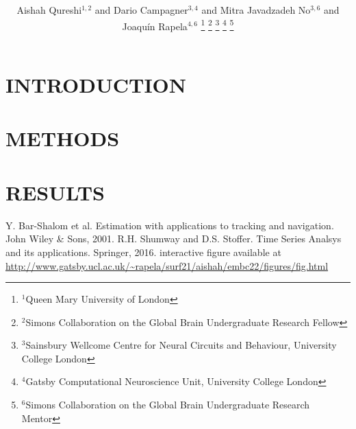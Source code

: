 \documentclass[letterpaper, 10 pt, conference]{ieeeconf}  %
\title{\LARGE \bf

}
\author{Aishah Qureshi$^{1,2}$ and Dario Campagner$^{3,4}$ and
Mitra Javadzadeh No$^{3,6}$ and
Joaqu\'{i}n Rapela$^{4,6}$%
\thanks{$^{1}$Queen Mary University of London}%
\thanks{$^{2}$Simons Collaboration on the Global Brain Undergraduate Research Fellow}%
\thanks{$^{3}$Sainsbury Wellcome Centre for Neural Circuits and Behaviour, University College London}%
\thanks{$^{4}$Gatsby Computational Neuroscience Unit, University College London}%
\thanks{$^{6}$Simons Collaboration on the Global Brain Undergraduate Research Mentor}%
}
\begin{document}
\maketitle
\thispagestyle{empty}
\pagestyle{empty}


\begin{abstract}



\end{abstract}



\section{INTRODUCTION}



\section{METHODS}



\section{RESULTS}



\addtolength{\textheight}{-12cm}   %








\begin{thebibliography}{99}

 Y. Bar-Shalom et al. Estimation with applications to tracking and navigation. John Wiley \& Sons, 2001.
 R.H. Shumway and D.S. Stoffer. Time Series Analsys and its applications. Springer, 2016.
 interactive figure available at \url{http://www.gatsby.ucl.ac.uk/~rapela/surf21/aishah/embc22/figures/fig.html}
\end{thebibliography}
\end{document}
